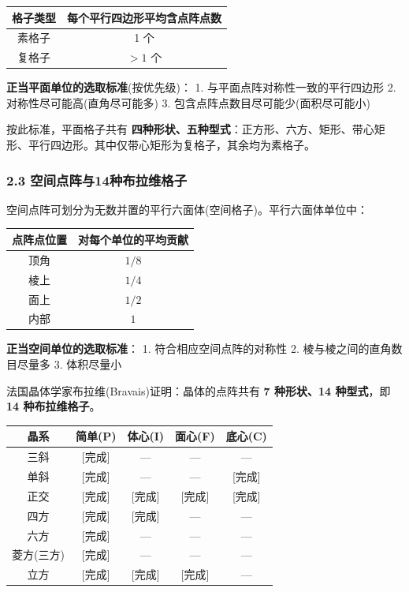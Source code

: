 \documentclass[a4paper,11pt]{ctexart}
\newcounter{none}
\newcommand{\箭}{\ensuremath{\rightarrow}}
\newcommand{\左箭}{\ensuremath{\leftarrow}}
\newcommand{\上箭}{\ensuremath{\uparrow}}
\newcommand{\下箭}{\ensuremath{\downarrow}}
\newcommand{\衡}{\ensuremath{\rightleftharpoons}}
\newcommand{\双箭}{\ensuremath{\leftrightarrow}}
\newcommand{\约等于}{\ensuremath{\approx}}
\newcommand{\小于等于}{\ensuremath{\leq}}
\newcommand{\大于等于}{\ensuremath{\geq}}
\newcommand{\不等于}{\ensuremath{\neq}}
\newcommand{\西格马}{\ensuremath{\sigma}}
\newcommand{\派}{\ensuremath{\pi}}
\begin{document}
{\def\LTcaptype{none} %
\begin{longtable}[]{@{}cc@{}}
\toprule\noalign{}
格子类型 & 每个平行四边形平均含点阵点数 \\
\midrule\noalign{}
\endhead
\bottomrule\noalign{}
\endlastfoot
素格子 & 1 个 \\
复格子 & \(>1\) 个 \\
\end{longtable}
}

\textbf{正当平面单位的选取标准}(按优先级)：
1. 与平面点阵对称性一致的平行四边形
2. 对称性尽可能高(直角尽可能多)
3. 包含点阵点数目尽可能少(面积尽可能小)

按此标准，平面格子共有 \textbf{四种形状、五种型式}：正方形、六方、矩形、带心矩形、平行四边形。其中仅带心矩形为复格子，其余均为素格子。

\subsubsection{2.3 空间点阵与14种布拉维格子}\label{ux7a7aux95f4ux70b9ux9635ux4e0e14ux79cdux5e03ux62c9ux7ef4ux683cux5b50}

空间点阵可划分为无数并置的平行六面体(空间格子)。平行六面体单位中：

{\def\LTcaptype{none} %
\begin{longtable}[]{@{}cc@{}}
\toprule\noalign{}
点阵点位置 & 对每个单位的平均贡献 \\
\midrule\noalign{}
\endhead
\bottomrule\noalign{}
\endlastfoot
顶角 & \(1/8\) \\
棱上 & \(1/4\) \\
面上 & \(1/2\) \\
内部 & \(1\) \\
\end{longtable}
}

\textbf{正当空间单位的选取标准}：
1. 符合相应空间点阵的对称性
2. 棱与棱之间的直角数目尽量多
3. 体积尽量小

法国晶体学家布拉维(Bravais)证明：晶体的点阵共有 \textbf{7 种形状、14 种型式}，即 \textbf{14 种布拉维格子}。

{\def\LTcaptype{none} %
\begin{longtable}[]{@{}ccccc@{}}
\toprule\noalign{}
晶系 & 简单(P) & 体心(I) & 面心(F) & 底心(C) \\
\midrule\noalign{}
\endhead
\bottomrule\noalign{}
\endlastfoot
三斜 & {[}完成{]} & --- & --- & --- \\
单斜 & {[}完成{]} & --- & --- & {[}完成{]} \\
正交 & {[}完成{]} & {[}完成{]} & {[}完成{]} & {[}完成{]} \\
四方 & {[}完成{]} & {[}完成{]} & --- & --- \\
六方 & {[}完成{]} & --- & --- & --- \\
菱方(三方) & {[}完成{]} & --- & --- & --- \\
立方 & {[}完成{]} & {[}完成{]} & {[}完成{]} & --- \\
\end{longtable}
}
\end{document}
